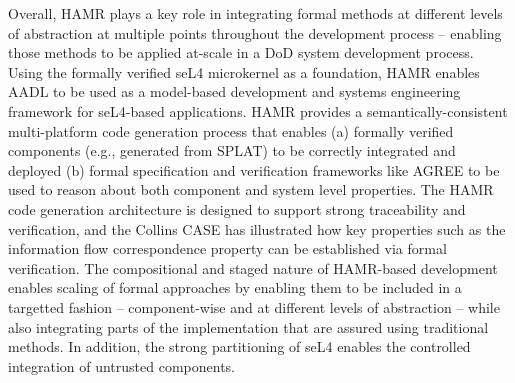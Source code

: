Overall, HAMR plays a key role in integrating formal methods at different levels of abstraction at multiple points throughout the development process -- enabling those methods to be applied at-scale in a DoD system development process.   Using the formally verified seL4 microkernel as a foundation, HAMR enables AADL to be used as a model-based development and systems engineering framework for seL4-based applications.  HAMR provides a semantically-consistent multi-platform code generation process that enables (a) formally verified components (e.g., generated from SPLAT) to be correctly integrated and deployed (b) formal specification and verification frameworks like AGREE to be used to reason about both component and system level properties.   The HAMR code generation architecture is designed to support strong traceability and verification, and the Collins CASE has illustrated how key properties such as the information flow correspondence property can be established via formal verification.    The compositional and staged nature of HAMR-based development enables scaling of formal approaches by enabling them to be included in a targetted fashion -- component-wise and at different levels of abstraction -- while also integrating parts of the implementation that are assured using traditional methods.   In addition, the strong partitioning of seL4 enables the controlled integration of untrusted components.






